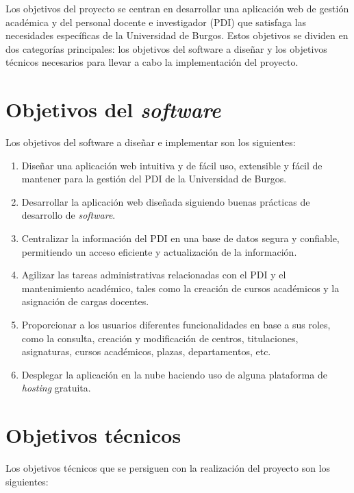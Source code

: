
Los objetivos del proyecto se centran en desarrollar una aplicación web de gestión académica y del personal docente e investigador (PDI) que satisfaga las necesidades específicas de la Universidad de Burgos. Estos objetivos se dividen en dos categorías principales: los objetivos del software a diseñar y los objetivos técnicos necesarios para llevar a cabo la implementación del proyecto.

\section{Objetivos del \textit{software}}

Los objetivos del software a diseñar e implementar son los siguientes:

\begin{enumerate}
	\item Diseñar una aplicación web intuitiva y de fácil uso, extensible y fácil de mantener para la gestión del PDI de la Universidad de Burgos.
  \item Desarrollar la aplicación web diseñada siguiendo buenas prácticas de desarrollo de \textit{software}.
  \item Centralizar la información del PDI en una base de datos segura y confiable, permitiendo un acceso eficiente y actualización de la información.
  \item Agilizar las tareas administrativas relacionadas con el PDI y el mantenimiento académico, tales como la creación de cursos académicos y la asignación de cargas docentes.
  \item Proporcionar a los usuarios diferentes funcionalidades en base a sus roles, como la consulta, creación y modificación de centros, titulaciones, asignaturas, cursos académicos, plazas, departamentos, etc.
  \item Desplegar la aplicación en la nube haciendo uso de alguna plataforma de \textit{hosting} gratuita.
\end{enumerate}

\section{Objetivos técnicos}

Los objetivos técnicos que se persiguen con la realización del proyecto son los siguientes:

